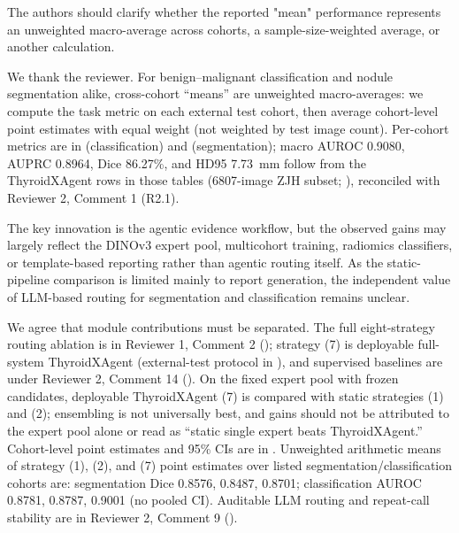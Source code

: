\begin{reviewercomment}
The authors should clarify whether the reported "mean" performance represents an unweighted macro-average across cohorts, a sample-size-weighted average, or another calculation.
\end{reviewercomment}
\begin{authorresponse}
We thank the reviewer. For benign--malignant classification and nodule segmentation alike, cross-cohort ``means'' are unweighted macro-averages: we compute the task metric on each external test cohort, then average cohort-level point estimates with equal weight (not weighted by test image count). Per-cohort metrics are in  (classification) and  (segmentation); macro AUROC 0.9080, AUPRC 0.8964, Dice 86.27\%, and HD95 7.73~mm follow from the ThyroidXAgent rows in those tables (6807-image ZJH subset; ), reconciled with Reviewer 2, Comment 1 (R2.1).\par
\par
\end{authorresponse}

\begin{reviewercomment}
The key innovation is the agentic evidence workflow, but the observed gains may largely reflect the DINOv3 expert pool, multicohort training, radiomics classifiers, or template-based reporting rather than agentic routing itself. As the static-pipeline comparison is limited mainly to report generation, the independent value of LLM-based routing for segmentation and classification remains unclear.
\end{reviewercomment}
\begin{authorresponse}
We agree that module contributions must be separated. The full eight-strategy routing ablation is in Reviewer 1, Comment 2 (); strategy (7) is deployable full-system ThyroidXAgent (external-test protocol in ), and supervised baselines are under Reviewer 2, Comment 14 (). On the fixed expert pool with frozen candidates, deployable ThyroidXAgent (7) is compared with static strategies (1) and (2); ensembling is not universally best, and gains should not be attributed to the expert pool alone or read as ``static single expert beats ThyroidXAgent.'' Cohort-level point estimates and 95\% CIs are in . Unweighted arithmetic means of strategy (1), (2), and (7) point estimates over listed segmentation/classification cohorts are: segmentation Dice 0.8576, 0.8487, 0.8701; classification AUROC 0.8781, 0.8787, 0.9001 (no pooled CI). Auditable LLM routing and repeat-call stability are in Reviewer 2, Comment 9 ().
\par
\end{authorresponse}

